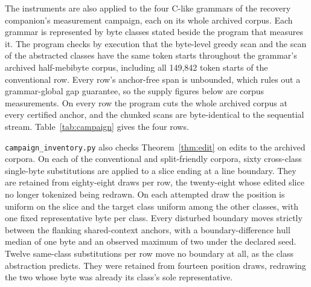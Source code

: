 \documentclass[11pt,a4paper]{article}
\theoremstyle{definition}
\theoremstyle{plain}
\newcommand{\code}[1]{\texttt{#1}}
\begin{document}
The instruments are also applied to the four C-like grammars of the recovery companion's measurement campaign, each on
its whole archived corpus. Each grammar is represented by byte classes stated beside the program that measures it. The
program checks by execution that the byte-level greedy scan and the scan of the abstracted classes have the same token
starts throughout the grammar's archived half-mebibyte corpus, including all 149{,}842 token starts of the conventional
row. Every row's anchor-free span is unbounded, which rules out a grammar-global gap guarantee, so the supply figures
below are corpus measurements. On every row the program cuts the whole archived corpus at every certified anchor, and
the chunked scans are byte-identical to the sequential stream. Table~\ref{tab:campaign} gives the four rows.

\code{campaign\_inventory.py} also checks Theorem~\ref{thm:edit} on edits to the archived corpora. On each of the
conventional and split-friendly corpora, sixty cross-class single-byte substitutions are applied to a slice ending at a
line boundary. They are retained from eighty-eight draws per row, the twenty-eight whose edited slice no longer
tokenized being redrawn. On each attempted draw the position is uniform on the slice and the target class uniform among
the other classes, with one fixed representative byte per class. Every disturbed boundary moves strictly between the
flanking shared-context anchors, with a boundary-difference hull median of one byte and an observed maximum of two under
the declared seed. Twelve same-class substitutions per row move no boundary at all, as the class abstraction predicts.
They were retained from fourteen position draws, redrawing the two whose byte was already its class's sole
representative.

\begin{table}[!htbp]
\centering

\caption{Certified-anchor supply of the recovery campaign's four C-like grammars on their archived corpora, emitted by
\code{campaign\_inventory.py}. Gaps and snap distances are in bytes. Gap statistics here include the endpoints, the run
from position zero to the first anchor and the run from the last anchor to the end of the corpus, so they are not
comparable row for row with Table~\ref{tab:supply}, whose gaps exclude both.}
\label{tab:campaign}
\end{table}
\FloatBarrier
\end{document}
